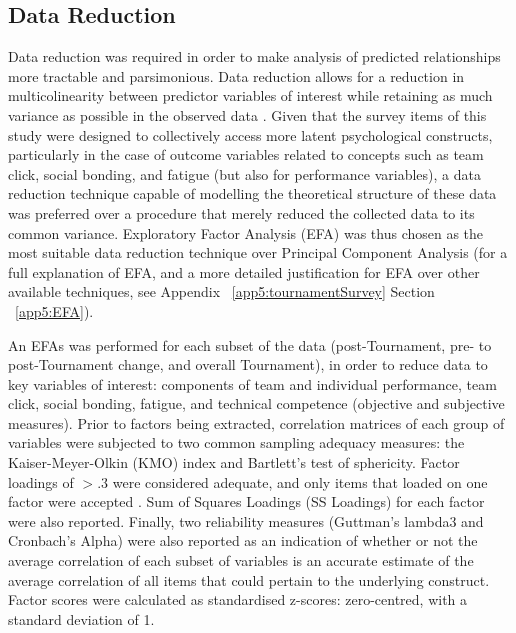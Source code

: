 \clearpage


\begin{landscape}






\end{landscape}
\restoregeometry

\bigskip




\subsection{\label{Ch5:dataReduction}Data Reduction}
Data reduction was required in order to make analysis of predicted relationships more tractable and parsimonious. Data reduction allows for a reduction in multicolinearity between predictor variables of interest while retaining as much variance as possible in the observed data \citep{Yong2013}.  Given that the survey items of this study were designed to collectively access more latent psychological constructs, particularly in the case of outcome variables related to concepts such as team click, social bonding, and fatigue (but also for performance variables), a data reduction technique capable of modelling the theoretical structure of these data was preferred over a procedure that merely reduced the collected data to its common variance.  Exploratory Factor Analysis (EFA) was thus chosen as the most suitable data reduction technique over Principal Component Analysis (for a full explanation of EFA, and a more detailed justification for EFA over other available techniques, see Appendix ~\ref{app5:tournamentSurvey} Section ~\ref{app5:EFA}).

An EFAs was performed for each subset of the data (post-Tournament, pre- to post-Tournament change, and overall Tournament), in order to reduce data to key variables of interest: components of team and individual performance, team click, social bonding, fatigue, and technical competence (objective and subjective measures). Prior to factors being extracted, correlation matrices of each group of variables were subjected to two common sampling adequacy measures: the Kaiser-Meyer-Olkin (KMO) index and Bartlett’s test of sphericity.  Factor loadings of $> .3$ were considered adequate, and only items that loaded on one factor were accepted \citep{Field2012}. Sum of Squares Loadings (SS Loadings) for each factor were also reported\citep{Dziuban1974}.  Finally, two reliability measures (Guttman's lambda3 and Cronbach's Alpha) were also reported as an indication of whether or not the average correlation of each subset of variables is an accurate estimate of the average correlation of all items that could pertain to the underlying construct.  Factor scores were calculated as standardised z-scores: zero-centred, with a standard deviation of 1.



